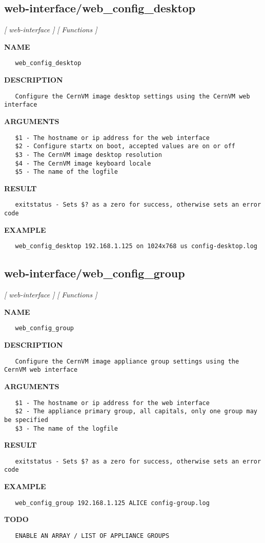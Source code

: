 \subsection{web-interface/web\_config\_desktop}
\textsl{[ web-interface ]}
\textsl{[ Functions ]}

\label{ch:robo48}
\label{ch:web_interface_web_config_desktop}
\textbf{NAME}
\begin{verbatim}
   web_config_desktop
\end{verbatim}
\textbf{DESCRIPTION}
\begin{verbatim}
   Configure the CernVM image desktop settings using the CernVM web interface
\end{verbatim}
\textbf{ARGUMENTS}
\begin{verbatim}
   $1 - The hostname or ip address for the web interface
   $2 - Configure startx on boot, accepted values are on or off
   $3 - The CernVM image desktop resolution
   $4 - The CernVM image keyboard locale
   $5 - The name of the logfile
\end{verbatim}
\textbf{RESULT}
\begin{verbatim}
   exitstatus - Sets $? as a zero for success, otherwise sets an error code
\end{verbatim}
\textbf{EXAMPLE}
\begin{verbatim}
   web_config_desktop 192.168.1.125 on 1024x768 us config-desktop.log
\end{verbatim}
\newpage
\subsection{web-interface/web\_config\_group}
\textsl{[ web-interface ]}
\textsl{[ Functions ]}

\label{ch:robo49}
\label{ch:web_interface_web_config_group}
\textbf{NAME}
\begin{verbatim}
   web_config_group
\end{verbatim}
\textbf{DESCRIPTION}
\begin{verbatim}
   Configure the CernVM image appliance group settings using the CernVM web interface
\end{verbatim}
\textbf{ARGUMENTS}
\begin{verbatim}
   $1 - The hostname or ip address for the web interface
   $2 - The appliance primary group, all capitals, only one group may be specified
   $3 - The name of the logfile
\end{verbatim}
\textbf{RESULT}
\begin{verbatim}
   exitstatus - Sets $? as a zero for success, otherwise sets an error code
\end{verbatim}
\textbf{EXAMPLE}
\begin{verbatim}
   web_config_group 192.168.1.125 ALICE config-group.log
\end{verbatim}
\textbf{TODO}
\begin{verbatim}
   ENABLE AN ARRAY / LIST OF APPLIANCE GROUPS
\end{verbatim}
\newpage
